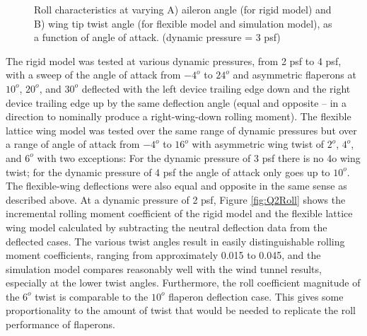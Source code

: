 \documentclass[11pt]{ucthesis}
\begin{document}
\begin{figure}[thpb]
\hfill
{}
\hfill
{}
\hfill
\caption{Roll characteristics at varying A) aileron angle (for rigid model) and B) wing tip twist angle (for flexible model and simulation model), as a function of angle of attack. (dynamic pressure = 3 psf)}
\label{fig:Q3Roll}
\end{figure}

The rigid model was tested at various dynamic pressures, from 2 psf to 4 psf, with a sweep of the angle of attack from $−4^o$ to $24^o$ and asymmetric flaperons at $10^o$, $20^o$, and $30^o$ deflected with the left device trailing edge down and the right device trailing edge up by the same deflection angle (equal and opposite – in a direction to nominally produce a right-wing-down rolling moment).  The flexible lattice wing model was tested over the same range of dynamic pressures but over a range of angle of attack from $−4^o$ to $16^o$ with asymmetric wing twist of $2^o$, $4^o$, and $6^o$ with two exceptions:  For the dynamic pressure of 3 psf there is no 4o wing twist; for the dynamic pressure of 4 psf the angle of attack only goes up to $10^o$.  The flexible-wing deflections were also equal and opposite in the same sense as described above.  At a dynamic pressure of 2 psf, Figure \ref{fig:Q2Roll} shows the incremental rolling moment coefficient of the rigid model and the flexible lattice wing model calculated by subtracting the neutral deflection data from the deflected cases. The various twist angles result in easily distinguishable rolling moment coefficients, ranging from approximately 0.015 to 0.045, and the simulation model compares reasonably well with the wind tunnel results, especially at the lower twist angles. Furthermore, the roll coefficient magnitude of the $6^o$ twist is comparable to the $10^o$ flaperon deflection case. This gives some proportionality to the amount of twist that would be needed to replicate the roll performance of flaperons.
\end{document}
